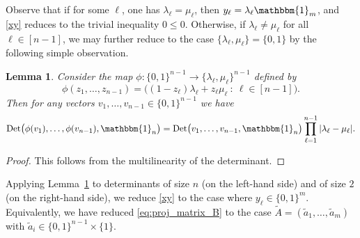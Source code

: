 \documentclass[11pt]{amsart}
\newcommand{\Ivan}[1]{\todo[size=\tiny,inline,color=green!30]{#1 \\ \hfill --- Vanya}}
\newtheorem{lemma}[thm]{Lemma}
\theoremstyle{definition}
\theoremstyle{remark}
\newcommand{\Det}{\operatorname{Det}}
\newcommand{\onevec}{\mathbbm{1}}
\begin{document}


Observe that if for some $\ell$, one has $\lambda_\ell = \mu_\ell$, then $y_\ell= \lambda_\ell \onevec_m$, and \eqref{xy} reduces to the trivial inequality $0 \le 0$. Otherwise, if $\lambda_\ell \neq \mu_\ell$ for all $\ell\in [n-1]$, we may further reduce to the case 
$\{\lambda_\ell,  \mu_\ell\}= \{0,1\}$ by the following simple observation.


\begin{lemma} \label{box:to:cube} 
Consider the map $\phi : \{0,1\}^{n-1} \to \{\lambda_\ell,  \mu_\ell\}^{n-1}$ defined by
\[
\phi(z_1,\ldots,z_{n-1}) = \bigl((1-z_\ell)\lambda_\ell + z_\ell \mu_\ell\ :\ \ell \in [n-1]\bigr).
\]
Then for any vectors $v_1,\dots, v_{n-1}\in \{0,1\}^{n-1}$ we have
\[
\Det\bigl(\phi(v_1),\ldots,\phi(v_{n-1}), \onevec_n\bigr)
= 
\Det\bigl(v_1,\ldots,v_{n-1}, \onevec_n\bigr)\prod_{\ell=1}^{n-1} |\lambda_\ell - \mu_\ell|.
\]
\end{lemma} 
\begin{proof} This follows from the multilinearity of the determinant.
\end{proof} 


Applying Lemma~\ref{box:to:cube} to determinants of size $n$ (on the left-hand side) and of size $2$ (on the right-hand side), we reduce \eqref{xy} to the case where $y_\ell \in \{0,1\}^m$. 
%
Equivalently, 
we have reduced \eqref{eq:proj_matrix_B} to the case $\tilde A = (\tilde a_1,\ldots,\tilde a_m)$ with $\tilde a_i \in \{0,1\}^{n-1}\times \{1\}$. 
\end{document}
